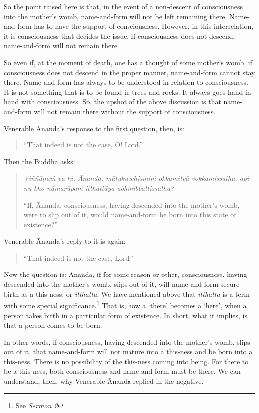 So the point raised here is that, in the event of a non-descent of consciousness into the mother's womb, name-and-form will not be left remaining there. Name-and-form has to have the support of consciousness. However, in this interrelation, it is consciousness that decides the issue. If consciousness does not descend, name-and-form will not remain there.

So even if, at the moment of death, one has a thought of some mother's womb, if consciousness does not descend in the proper manner, name-and-form cannot stay there. Name-and-form has always to be understood in relation to consciousness. It is not something that is to be found in trees and rocks. It always goes hand in hand with consciousness. So, the upshot of the above discussion is that name-and-form will not remain there without the support of consciousness.

Venerable Ānanda's response to the first question, then, is:

\begin{quote}
``That indeed is not the case, O! Lord.''
\end{quote}

Then the Buddha asks:

\begin{quote}
\emph{Viññāṇaṁ va hi, Ānanda, mātukucchismiṁ okkamitvā vokkamissatha, api nu kho nāmarūpaṁ itthattāya abhinibbattissatha?}

``If, Ānanda, consciousness, having descended into the mother's womb, were to slip out of it, would name-and-form be born into this state of existence?''
\end{quote}

Venerable Ānanda's reply to it is again:

\begin{quote}
``That indeed is not the case, Lord.''
\end{quote}

Now the question is: Ānanda, if for some reason or other, consciousness, having descended into the mother's womb, slips out of it, will name-and-form secure birth as a this-ness, or \emph{itthatta}. We have mentioned above that \emph{itthatta} is a term with some special significance.\footnote{See \emph{Sermon 2}} That is, how a `there' becomes a `here', when a person takes birth in a particular form of existence. In short, what it implies, is that a person comes to be born.

In other words, if consciousness, having descended into the mother's womb, slips out of it, that name-and-form will not mature into a this-ness and be born into a this-ness. There is no possibility of the this-ness coming into being. For there to be a this-ness, both consciousness and name-and-form must be there. We can understand, then, why Venerable Ānanda replied in the negative.

